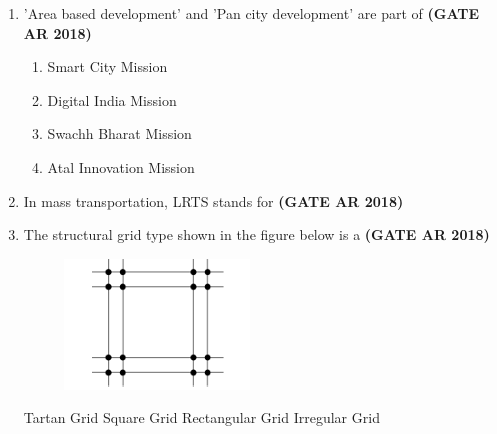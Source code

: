 \documentclass[journal,15pt,onecolumn]{IEEEtran}
\theoremstyle{remark}
\begin{document}
\begin{enumerate}
\vspace{1.5em}

\item 
'Area based development' and 'Pan city development' are part of\hfill \textbf{ (GATE AR 2018)}

\vspace{0.5em}

\begin{enumerate}
\item  Smart City Mission 
\item Digital India Mission 
\item Swachh Bharat Mission
\item Atal Innovation Mission
\end{enumerate}

\vspace{1cm}


\item 
In mass transportation, LRTS stands for\hfill \textbf{ (GATE AR 2018)}



\vspace{0.5cm}

\item  The structural grid type shown in the figure below is a\hfill \textbf{ (GATE AR 2018)}


\begin{figure}[H]
    \centering
    \includegraphics[width=0.25\linewidth]{figs/10.png}
 
\end{figure}



\begin{center}
\hspace{1cm}
  Tartan Grid \hspace{1cm}   Square Grid \hspace{1cm}   Rectangular Grid \hspace{1cm}   Irregular Grid
\end{center}


\end{enumerate}
\end{document}

